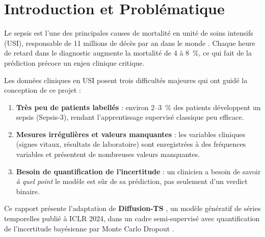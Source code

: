 \documentclass[11pt,a4paper]{article}
\begin{document}
\tableofcontents
\newpage


\section{Introduction et Problématique}

Le sepsis est l'une des principales causes de mortalité en unité de soins intensifs (USI),
responsable de 11 millions de décès par an dans le monde \cite{physionet2019}.
Chaque heure de retard dans le diagnostic augmente la mortalité de 4 à 8~\%, ce qui
fait de la prédiction précoce un enjeu clinique critique.

Les données cliniques en USI posent trois difficultés majeures qui ont guidé la conception
de ce projet :

\begin{enumerate}[leftmargin=2em]
    \item \textbf{Très peu de patients labellés} : environ 2--3~\% des patients développent
    un sepsis (Sepsis-3), rendant l'apprentissage supervisé classique peu efficace.
    \item \textbf{Mesures irrégulières et valeurs manquantes} : les variables cliniques
    (signes vitaux, résultats de laboratoire) sont enregistrées à des fréquences
    variables et présentent de nombreuses valeurs manquantes.
    \item \textbf{Besoin de quantification de l'incertitude} : un clinicien a besoin de
    savoir \emph{à quel point} le modèle est sûr de sa prédiction, pas seulement
    d'un verdict binaire.
\end{enumerate}

Ce rapport présente l'adaptation de \textbf{Diffusion-TS} \cite{diffusion-ts}, un modèle
génératif de séries temporelles publié à ICLR 2024, dans un cadre semi-supervisé avec
quantification de l'incertitude bayésienne par Monte Carlo Dropout \cite{gal2016dropout}.
\end{document}

